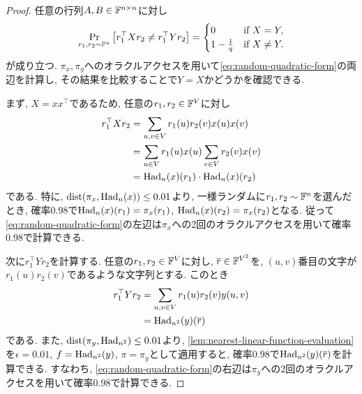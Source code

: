   \begin{proof}
  任意の行列$A,B\in\mathbb{F}^{n\times n}$に対し
  \begin{align}
    \Pr_{r_1,r_2\sim\mathbb{F}^n}\qty[ r_1^\top X r_2 \ne r_1^\top Y r_2 ] =
    \begin{cases}
      0 & \text{if } X=Y,\\
      1-\frac{1}{q} & \text{if } X\ne Y.
    \end{cases} \label{eq:random-quadratic-form}
  \end{align}
  が成り立つ.
  $\pi_x,\pi_y$へのオラクルアクセスを用いて\cref{eq:random-quadratic-form}の両辺を計算し, その結果を比較することで$Y=X$かどうかを確認できる.
  
  まず, $X=xx^\top$であるため, 任意の$r_1,r_2\in\mathbb{F}^V$に対し
  \begin{align*}
    r_1^\top X r_2 &= \sum_{u,v\in V} r_1(u) r_2(v) x(u)x(v) \\
    &= \sum_{u\in V} r_1(u) x(u) \sum_{v\in V} r_2(v) x(v) \\
    &= \mathrm{Had}_n(x)(r_1)\cdot \mathrm{Had}_n(x)(r_2)
  \end{align*}
  である. 特に, $\mathrm{dist}(\pi_x,\mathrm{Had}_n(x))\le 0.01$より, 一様ランダムに$r_1,r_2\sim\mathbb{F}^n$を選んだとき, 確率$0.98$で$\mathrm{Had}_n(x)(r_1)=\pi_x(r_1)$, $\mathrm{Had}_n(x)(r_2)=\pi_x(r_2)$となる.
  従って\cref{eq:random-quadratic-form}の左辺は$\pi_x$への2回のオラクルアクセスを用いて確率$0.98$で計算できる.

  次に$r_1^\top Y r_2$を計算する. 任意の$r_1,r_2\in\mathbb{F}^V$に対し, $\overline{r}\in\mathbb{F}^{V^2}$を, $(u,v)$番目の文字が$r_1(u)r_2(v)$であるような文字列とする. このとき
  \begin{align*}
    r_1^\top Y r_2 &= \sum_{u,v\in V} r_1(u) r_2(v) y(u,v) \\
    &= \mathrm{Had}_{n^2}(y)(\overline{r})
  \end{align*}
  である. また, $\mathrm{dist}(\pi_y,\mathrm{Had}_{n^2})\le 0.01$より, \cref{lem:nearest-linear-function-evaluation}を$\epsilon=0.01$, $f=\mathrm{Had}_{n^2}(y)$, $\pi=\pi_y$として適用すると, 確率$0.98$で$\mathrm{Had}_{n^2}(y)(\overline{r})$を計算できる.
  すなわち, \cref{eq:random-quadratic-form}の右辺は$\pi_y$への2回のオラクルアクセスを用いて確率$0.98$で計算できる.


\end{proof}

